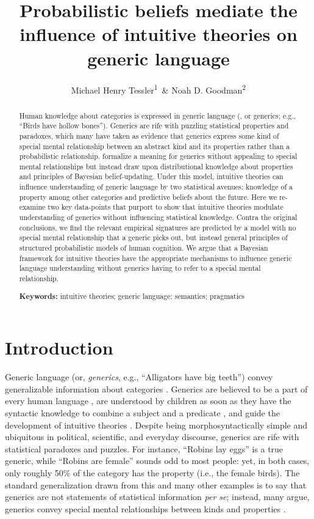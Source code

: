 \documentclass[floatsintext, 11pt, doc]{apa6}
\title{Probabilistic beliefs mediate the influence of intuitive theories on generic language}
\author{Michael Henry Tessler\textsuperscript{1}~\& Noah D. Goodman\textsuperscript{2}}
\affiliation{
\vspace{0.5cm}
 \textsuperscript{1} Massachusetts Institute of Technology, Department of Brain and Cognitive Sciences\\\textsuperscript{2} Stanford University, Departments of Psychology and Computer Science 
}
\begin{document}
\maketitle

\begin{abstract}

Human knowledge about categories is expressed in generic language (, or generics; e.g., ``Birds have hollow bones''). 
Generics are rife with puzzling statistical properties and paradoxes, which many have taken as evidence that generics express some kind of special mental relationship between an abstract kind and its properties rather than a probabilistic relationship. 
 formalize a meaning for generics without appealing to special mental relationships but instead draw upon distributional knowledge about properties and principles of Bayesian belief-updating.
Under this model, intuitive theories can influence understanding of generic language by two statistical avenues: knowledge of a property among other categories and predictive beliefs about the future. 
Here we re-examine two key data-points that purport to show that intuitive theories modulate understanding of generics without influencing statistical knowledge. 
Contra the original conclusions, we find the relevant empirical signatures are predicted by a model with no special mental relationship that a generic picks out, but instead general principles of structured probabilistic models of human cognition. 
We argue that a Bayesian framework for intuitive theories have the appropriate mechanisms to influence generic language understanding without generics having to refer to a special mental relationship.

\textbf{Keywords:} 
intuitive theories; generic language; semantics; pragmatics
\end{abstract}

\section{Introduction}
\label{sec:intro}


Generic language (or, \emph{generics}, e.g., ``Alligators have big teeth'') convey generalizable information about categories \cite{Carlson1977, Carlson1995}.
Generics are believed to be a part of every human language \cite{Behrens2005}, are understood by children as soon as they have the syntactic knowledge to combine a subject and a predicate \cite{graham2011two}, and guide the development of intuitive theories \cite{Gelman2003}.
Despite being morphosyntactically simple and ubiquitous in political, scientific, and everyday discourse, generics are rife with statistical paradoxes and puzzles.
For instance, ``Robins lay eggs'' is a true generic, while ``Robins are female'' sounds odd to most people: yet, in both cases, only roughly 50\% of the category has the property (i.e., the female birds). 
The standard generalization drawn from this and many other examples is to say that generics are not statements of statistical information \emph{per se}; instead, many argue, generics convey special mental relationships between kinds and properties \cite{Gelman2007, Leslie2008, Prasada2000, Cimpian2010theory, Cimpian2010}.
\end{document}
